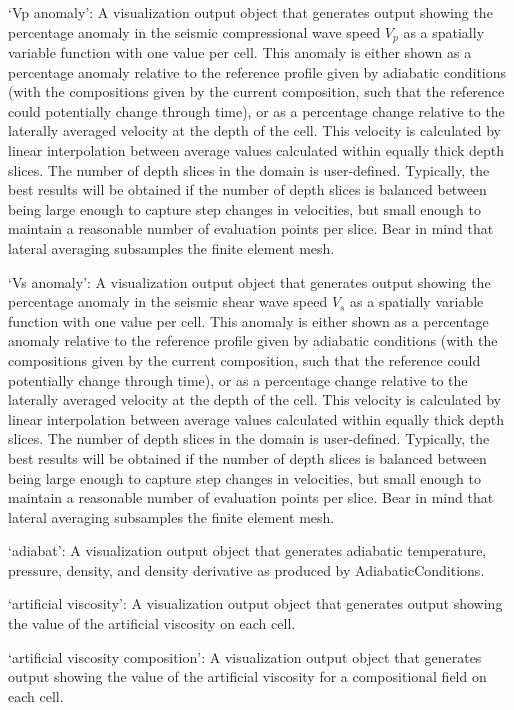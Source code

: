 \begin{itemize}
`Vp anomaly': A visualization output object that generates output showing the percentage anomaly in the seismic compressional wave speed $V_p$ as a spatially variable function with one value per cell. This anomaly is either shown as a percentage anomaly relative to the reference profile given by adiabatic conditions (with the compositions given by the current composition, such that the reference could potentially change through time), or as a percentage change relative to the laterally averaged velocity at the depth of the cell. This velocity is calculated by linear interpolation between average values calculated within equally thick depth slices. The number of depth slices in the domain is user-defined. Typically, the best results will be obtained if the number of depth slices is balanced between being large enough to capture step changes in velocities, but small enough to maintain a reasonable number of evaluation points per slice. Bear in mind that lateral averaging subsamples the finite element mesh.

`Vs anomaly': A visualization output object that generates output showing the percentage anomaly in the seismic shear wave speed $V_s$ as a spatially variable function with one value per cell. This anomaly is either shown as a percentage anomaly relative to the reference profile given by adiabatic conditions (with the compositions given by the current composition, such that the reference could potentially change through time), or as a percentage change relative to the laterally averaged velocity at the depth of the cell. This velocity is calculated by linear interpolation between average values calculated within equally thick depth slices. The number of depth slices in the domain is user-defined. Typically, the best results will be obtained if the number of depth slices is balanced between being large enough to capture step changes in velocities, but small enough to maintain a reasonable number of evaluation points per slice. Bear in mind that lateral averaging subsamples the finite element mesh.

`adiabat': A visualization output object that generates adiabatic temperature, pressure, density, and density derivative as produced by AdiabaticConditions.

`artificial viscosity': A visualization output object that generates output showing the value of the artificial viscosity on each cell.

`artificial viscosity composition': A visualization output object that generates output showing the value of the artificial viscosity for a compositional field on each cell.


\end{itemize}
